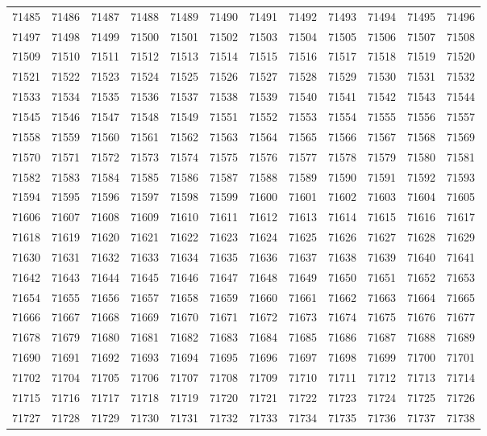 \begin{center}
\begin{longtable}{llllllllllll}
71485 &71486 &71487 &71488 &71489 &71490 &71491 &71492 &71493 &71494 &71495 &71496 \\
71497 &71498 &71499 &71500 &71501 &71502 &71503 &71504 &71505 &71506 &71507 &71508 \\
71509 &71510 &71511 &71512 &71513 &71514 &71515 &71516 &71517 &71518 &71519 &71520 \\
71521 &71522 &71523 &71524 &71525 &71526 &71527 &71528 &71529 &71530 &71531 &71532 \\
71533 &71534 &71535 &71536 &71537 &71538 &71539 &71540 &71541 &71542 &71543 &71544 \\
71545 &71546 &71547 &71548 &71549 &71551 &71552 &71553 &71554 &71555 &71556 &71557 \\
71558 &71559 &71560 &71561 &71562 &71563 &71564 &71565 &71566 &71567 &71568 &71569 \\
71570 &71571 &71572 &71573 &71574 &71575 &71576 &71577 &71578 &71579 &71580 &71581 \\
71582 &71583 &71584 &71585 &71586 &71587 &71588 &71589 &71590 &71591 &71592 &71593 \\
71594 &71595 &71596 &71597 &71598 &71599 &71600 &71601 &71602 &71603 &71604 &71605 \\
71606 &71607 &71608 &71609 &71610 &71611 &71612 &71613 &71614 &71615 &71616 &71617 \\
71618 &71619 &71620 &71621 &71622 &71623 &71624 &71625 &71626 &71627 &71628 &71629 \\
71630 &71631 &71632 &71633 &71634 &71635 &71636 &71637 &71638 &71639 &71640 &71641 \\
71642 &71643 &71644 &71645 &71646 &71647 &71648 &71649 &71650 &71651 &71652 &71653 \\
71654 &71655 &71656 &71657 &71658 &71659 &71660 &71661 &71662 &71663 &71664 &71665 \\
71666 &71667 &71668 &71669 &71670 &71671 &71672 &71673 &71674 &71675 &71676 &71677 \\
71678 &71679 &71680 &71681 &71682 &71683 &71684 &71685 &71686 &71687 &71688 &71689 \\
71690 &71691 &71692 &71693 &71694 &71695 &71696 &71697 &71698 &71699 &71700 &71701 \\
71702 &71704 &71705 &71706 &71707 &71708 &71709 &71710 &71711 &71712 &71713 &71714 \\
71715 &71716 &71717 &71718 &71719 &71720 &71721 &71722 &71723 &71724 &71725 &71726 \\
71727 &71728 &71729 &71730 &71731 &71732 &71733 &71734 &71735 &71736 &71737 &71738 \\

\end{longtable}
\end{center}
